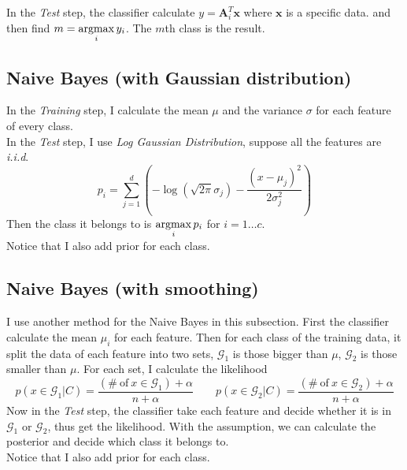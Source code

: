 \documentclass[8pt]{article}
\def\argmax{\mathop{\rm argmax}}
\begin{document}
In the \emph{Test} step, the classifier calculate $y=\bm{A}_i^T\bm{x}$
where $\bm{x}$ is a specific data.
and then find $m=\argmax\limits_{i}y_i$. The $m$th class is the result.

\subsection{Naive Bayes (with Gaussian distribution)}
In the \emph{Training} step, I calculate the mean $\mu$ and the variance $\sigma$
for each feature of every class.\\
In the \emph{Test} step, I use \emph{Log Gaussian Distribution}, suppose all the features are \textit{i.i.d}.
$$
p_i=\sum\limits_{j=1}^d
\left(-\log(\sqrt{2\pi}\sigma_j)-\frac{(x-\mu_j)^2}{2\sigma_j^2}
\right)
$$
Then the class it belongs to is $\argmax\limits_i p_i$ for $i=1\dots c$.\\
Notice that I also add prior for each class.

\subsection{Naive Bayes (with smoothing)}
I use another method for the Naive Bayes in this subsection.
First the classifier calculate the mean $\mu_i$ for each feature.
Then for each class of the training data, it split the data of each feature into two sets,
$\mathcal{G}_1$ is those bigger than $\mu$, $\mathcal{G}_2$ is those smaller than $\mu$.
For each set, I calculate the likelihood
$$p(x\in\mathcal{G}_1|C)=\frac{(\#\  \text{of}\  x\in\mathcal{G}_1) + \alpha}{n + \alpha}
\qquad
p(x\in\mathcal{G}_2|C)=\frac{(\#\  \text{of}\  x\in\mathcal{G}_2) + \alpha}{n + \alpha}
$$
Now in the \emph{Test} step, the classifier take each feature and decide whether it is in
$\mathcal{G}_1$ or $\mathcal{G}_2$, thus get the likelihood. With the  assumption,
we can calculate the posterior and decide which class it belongs to. \\
Notice that I also add prior for each class.
\end{document}
